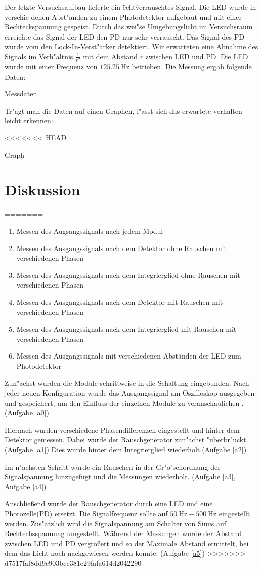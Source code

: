 \documentclass{scrartcl}
\begin{document}
			Der letzte Versuchsaufbau lieferte ein \"echt\" verrauschtes Signal.
			Die LED wurde in verschie-denen Abst"anden zu einem Photodetektor aufgebaut und mit einer Rechteckspannung gespeist.
			Durch das wei"se Umgebungslicht im Versuchsraum erreichte das Signal der LED den PD nur sehr verrauscht.
			Das Signal des PD wurde vom den Lock-In-Verst"arker detektiert.
			Wir erwarteten eine Abnahme des Signals im Verh"altnis $\frac{1}{r^2}$ mit dem Abstand $r$ zwischen LED und PD.
			Die LED wurde mit einer Frequenz von $\SI{125,25}{\hertz}$ betrieben. Die Messung ergab folgende Daten:


			Messdaten


			Tr"agt man die Daten auf einen Graphen, l"asst sich das erwartete verhalten leicht erkennen:

<<<<<<< HEAD

			Graph


	\section{Diskussion}
=======
\begin{enumerate}
\item \label{a0} Messen des Augsangssignals nach jedem Modul
\item \label{a1} Messen des Ausgangssignals nach dem Detektor ohne Rauschen mit verschiedenen Phasen
\item \label{a2} Messen des Ausgangssignals nach dem Integrierglied ohne Rauschen mit verschiedenen Phasen
\item \label{a3} Messen des Ausgangssignals nach dem Detektor mit Rauschen mit verschiedenen Phasen
\item \label{a4} Messen des Ausgangssignals nach dem Integrierglied mit Rauschen mit verschiedenen Phasen
\item \label{a5} Messen des Ausgangssignals mit verschiedenen Abständen der LED zum Photodetektor
\end{enumerate}

	Zun"achst wurden die Module schrittweise in die Schaltung eingebunden.
	Nach jeder neuen Konfiguration wurde das Ausgangssignal am Oszilloskop ausgegeben und gespeichert,
	um den Einfluss der einzelnen Module zu veranschaulichen . (Aufgabe \ref{a0})

	Hiernach wurden verschiedene Phasendifferenzen eingestellt und hinter dem Detektor gemessen.
	Dabei wurde der Rauschgenerator zun"achst "uberbr"uckt.(Aufgabe \ref{a1})
	Dies wurde hinter dem Integrierglied wiederholt.(Aufgabe \ref{a2})

	Im n"achsten Schritt wurde ein Rauschen in der Gr"o"senordnung der Signalspannung hinzugefügt und die Messungen
	wiederholt. (Aufgabe \ref{a3}, Aufgabe \ref{a4})

	Anschließend wurde der Rauschgenerator durch eine LED und eine Photozelle(PD) ersetzt.
	Die Signalfrequenz sollte auf $\SI{50}{\hertz}-\SI{500}{\hertz}$ eingestellt werden.
	Zus"atzlich wird die Signalspannung am Schalter von Sinus auf Rechtechsspannung umgestellt.
	Während der Messungen wurde der Abstand zwischen LED und PD vergrößert und so der Maximale Abstand ermittelt,
	bei dem das Licht noch nachgewiesen werden konnte. (Aufgabe \ref{a5})
>>>>>>> d7517faf8dd9c903bcc381e29fafa614d2042290
\end{document}
